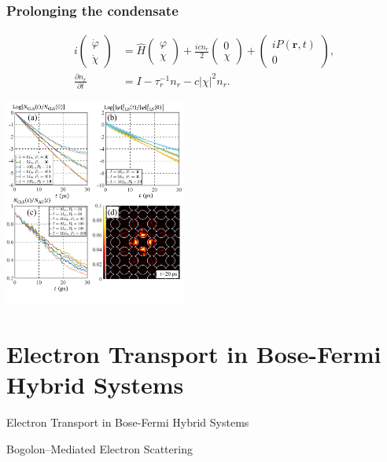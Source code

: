 \documentclass[9pt]{beamer}
\begin{document}
\begin{frame}[t]
\frametitle{Prolonging the condensate}
\begin{subequations}\label{CH3_INC}
\begin{align}
 i\begin{pmatrix}\dot{\varphi}\\\dot{\chi}\end{pmatrix} &=
 \hat{H}\begin{pmatrix}{\varphi}\\{\chi}\end{pmatrix}
 +\frac{{i}cn_r}{2}\begin{pmatrix}{0}\\{\chi}\end{pmatrix}
 +\begin{pmatrix}{iP(\mathbf{r},t)}\\{0}\end{pmatrix},  \nonumber \\
 \frac{\partial n_r}{\partial t} &= I - \tau_r^{-1} n_r-c|\chi|^2n_r. \nonumber
\end{align}
\end{subequations}
\begin{center}
\includegraphics[width=0.45\textwidth]{./fig/prolong.pdf}
\end{center}
\end{frame}

\section[Hybrid system]{Electron Transport in Bose-Fermi Hybrid Systems}

\begin{frame}
\begin{center}
\begin{Huge}
Electron Transport in Bose-Fermi Hybrid Systems
\end{Huge}
\end{center}

{\vspace{1.25cm}
\begin{center}
\begin{LARGE}
Bogolon--Mediated Electron Scattering~\cite{Sun:2019aa,Villegas:2019aa}
\end{LARGE}
\end{center}}
\end{frame}
\end{document}
